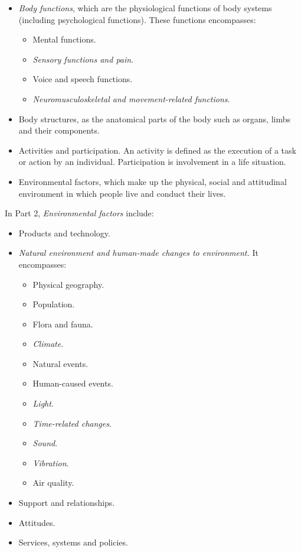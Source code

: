 \begin{itemize}
  \item \textit{Body functions}, which are the physiological functions of body 
  systems (including psychological functions). These functions encompasses:
    \begin{itemize}
      \item Mental functions.
      \item \textit{Sensory functions and pain}.
      \item Voice and speech functions.
      \item \textit{Neuromusculoskeletal and movement-related functions}.
    \end{itemize}
  \item Body structures, as the anatomical parts of the body such as organs, 
  limbs and their components.
  \item Activities and participation. An activity is defined as the execution of 
  a task or action by an individual. Participation is involvement in a life 
  situation.
  \item Environmental factors, which make up the physical, social and attitudinal
  environment in which people live and conduct their lives.
\end{itemize}

In Part 2, \textit{Environmental factors} include:

\begin{itemize}
  \item Products and technology.
  \item \textit{Natural environment and human-made changes to environment.} It 
  encompasses:
  \begin{multicols}{2}
    \begin{itemize}
      \item Physical geography.
      \item Population.
      \item Flora and fauna.
      \item \textit{Climate}.
      \item Natural events.
      \item Human-caused events.
      \item \textit{Light}.
      \item \textit{Time-related changes}.
      \item \textit{Sound}.
      \item \textit{Vibration}.
      \item Air quality.
    \end{itemize}
  \end{multicols}

  \item Support and relationships.
  \item Attitudes.
  \item Services, systems and policies.
\end{itemize}

